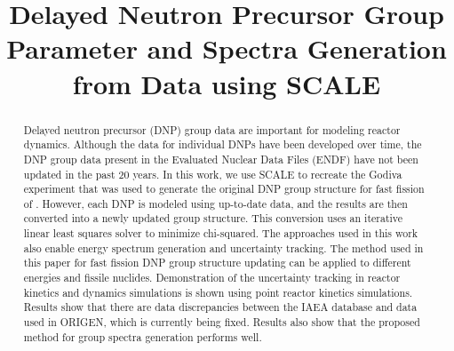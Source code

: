 \documentclass{style/nseJournal}
\begin{document}
\title{Delayed Neutron Precursor Group Parameter and Spectra Generation from Data using SCALE}

{}
{}

{}


\titlePage

\begin{abstract}
Delayed neutron precursor (DNP) group data are important for modeling reactor dynamics. Although the data for individual DNPs have been developed over time, the DNP group data present in the Evaluated Nuclear Data Files (ENDF) have not been updated in the past 20 years. In this work, we use SCALE to recreate the Godiva experiment that was used to generate the original DNP group structure for fast fission of . However, each DNP is modeled using up-to-date data, and the results are then converted into a newly updated group structure. This conversion uses an iterative linear least squares solver to minimize chi-squared. The approaches used in this work also enable energy spectrum generation and uncertainty tracking. The method used in this paper for fast  fission DNP group structure updating can be applied to different energies and fissile nuclides. Demonstration of the uncertainty tracking in reactor kinetics and dynamics simulations is shown using point reactor kinetics simulations. Results show that there are data discrepancies between the IAEA database and data used in ORIGEN, which is currently being fixed. Results also show that the proposed method for group spectra generation performs well.
\end{abstract}
\end{document}
